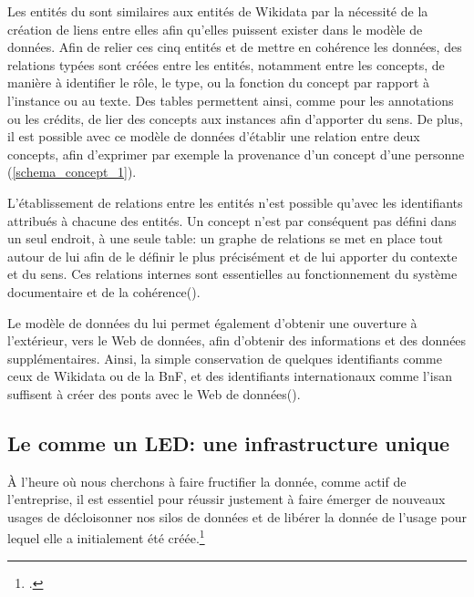 Les entités du \ldd sont similaires aux entités de Wikidata par la nécessité de la création de liens entre elles afin qu'elles puissent exister dans le modèle de données. Afin de relier ces cinq entités et de mettre en cohérence les données, des relations typées sont créées entre les entités, notamment entre les concepts, de manière à identifier le rôle, le type, ou la fonction du concept par rapport à l'instance ou au texte. Des tables permettent ainsi, comme pour les annotations ou les crédits, de lier des concepts aux instances afin d'apporter du sens. De plus, il est possible avec ce modèle de données d'établir une relation entre deux concepts, afin d'exprimer par exemple la provenance d'un concept d'une personne (\autoref{schema_concept_1}). 


L'établissement de relations entre les entités n'est possible qu'avec les identifiants attribués à chacune des entités. Un concept n'est par conséquent pas défini dans un seul endroit, à une seule table: un graphe de relations se met en place tout autour de lui afin de le définir le plus précisément et de lui apporter du contexte et du sens. Ces relations internes sont essentielles au fonctionnement du système documentaire et de la cohérence().


Le modèle de données du \ldd lui permet également d'obtenir une ouverture à l'extérieur, vers le Web de données, afin d'obtenir des informations et des données supplémentaires. Ainsi, la simple conservation de quelques identifiants comme ceux de Wikidata ou de la BnF, et des identifiants internationaux comme l'\ac{isan} suffisent à créer des ponts avec le Web de données().


\subsection{\label{III-B-2-c}Le \ldd comme un LED: une infrastructure unique}

\begin{citationLongue}
	À l’heure où nous cherchons à faire fructifier la donnée, comme actif de l’entreprise, il est essentiel pour réussir justement à faire émerger de nouveaux usages de décloisonner nos silos de données et de libérer la donnée de l’usage pour lequel elle a initialement été créée.\footcite{poupeau_reflexions_2018}
\end{citationLongue}


